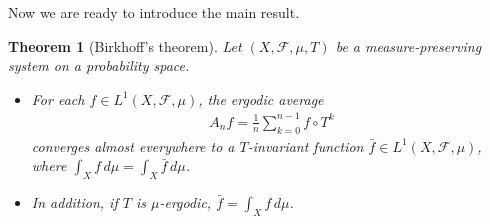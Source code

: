 \documentclass{article}
\numberwithin{equation}{section}
\newcommand{\scr}{\mathscr}
\theoremstyle{plain}
\newtheorem{theorem}{Theorem}[section]
\theoremstyle{definition}
\begin{document}
Now we are ready to introduce the main result.
\begin{theorem}[Birkhoff's theorem]
Let $(X,\scr{F},\mu,T)$ be a measure-preserving system on a probability space. \begin{itemize}
	\item[(i)] For each $f\in L^1(X,\scr{F},\mu)$, the ergodic average
	\begin{align*}
		A_nf=\frac{1}{n}\sum_{k=0}^{n-1}f\circ T^k
	\end{align*}
	converges almost everywhere to a $T$-invariant function $\bar{f}\in L^1(X,\scr{F},\mu)$, where $\int_X f\,d\mu=\int_X\bar{f}\,d\mu$. 
	\item[(ii)] In addition, if $T$ is $\mu$-ergodic, $\bar{f}=\int_X f\,d\mu$.
\end{itemize}
\end{theorem}
\end{document}
